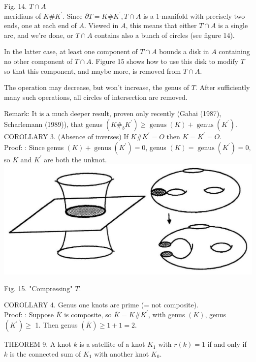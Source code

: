 \documentclass[10pt, letterpaper]{article}
\begin{document}
Fig. 14. $T \cap A$\\
meridians of $K \# K^{\prime}$. Since $\partial T=K \# K^{\prime}, T \cap A$ is a 1-manifold with precisely two ends, one at each end of $A$. Viewed in $A$, this means that either $T \cap A$ is a single arc, and we're done, or $T \cap A$ contains also a bunch of circles (see figure 14).

In the latter case, at least one component of $T \cap A$ bounds a disk in $A$ containing no other component of $T \cap A$. Figure 15 shows how to use this disk to modify $T$ so that this component, and maybe more, is removed from $T \cap A$.

The operation may decrease, but won't increase, the genus of $T$. After sufficiently many such operations, all circles of intersection are removed.

Remark: It is a much deeper result, proven only recently (Gabai (1987), Scharlemann (1989)), that genus $\left(K \#_{b} K^{\prime}\right) \geq \operatorname{genus}(K)+\operatorname{genus}\left(K^{\prime}\right)$.\\
COROLLARY 3. (Absence of inverses) If $K \# K^{\prime}=O$ then $K=K^{\prime}=O$.\\
Proof: : Since genus $(K)+\operatorname{genus}\left(K^{\prime}\right)=0$, genus $(K)=\operatorname{genus}\left(K^{\prime}\right)=0$, so $K$ and $K^{\prime}$ are both the unknot.\\
\includegraphics[scale=0.2, center]{2025_05_21_037de704f595ce642d3eg-086}

Fig. 15. "Compressing" $T$.

COROLLARY 4. Genus one knots are prime (= not composite).\\
Proof: : Suppose $\bar{K}$ is composite, so $\bar{K}=K \# K^{\prime}$, with genus $(K)$, genus $\left(K^{\prime}\right) \geq$ 1. Then genus $(\bar{K}) \geq 1+1=2$.

THEOREM 9. A knot $k$ is a satellite of a knot $K_{1}$ with $r(k)=1$ if and only if $k$ is the connected sum of $K_{1}$ with another knot $K_{0}$.
\end{document}
